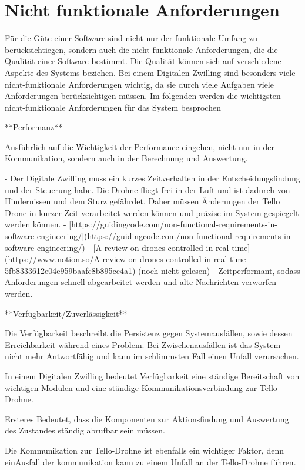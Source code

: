 \section{Nicht funktionale Anforderungen}

Für die Güte einer Software sind nicht nur der funktionale Umfang zu berücksichtiegen, sondern auch die nicht-funktionale Anforderungen, die die Qualität einer Software bestimmt. Die Qualität können sich auf verschiedene Aspekte des Systems beziehen. Bei einem Digitalen Zwilling sind besonders viele nicht-funktionale Anforderungen wichtig, da sie durch viele Aufgaben viele Anforderungen berücksichtigen müssen. Im folgenden werden die wichtigsten nicht-funktionale Anforderungen für das System besprochen

**Performanz**

Ausführlich auf die Wichtigkeit der Performance eingehen, nicht nur in der Kommunikation, sondern auch in der  Berechnung und Auswertung.


- Der Digitale Zwilling muss ein kurzes Zeitverhalten in der Entscheidungsfindung und der Steuerung habe. Die Drohne fliegt frei in der Luft und ist dadurch von Hindernissen und dem Sturz gefährdet. Daher müssen Änderungen der Tello Drone in kurzer Zeit verarbeitet werden können und präzise im System gespiegelt werden können.
    - [https://guidingcode.com/non-functional-requirements-in-software-engineering/](https://guidingcode.com/non-functional-requirements-in-software-engineering/)
    - [A review on drones controlled in real-time](https://www.notion.so/A-review-on-drones-controlled-in-real-time-5fb8333612e04e959baafc8b895cc4a1) (noch nicht gelesen)
- Zeitperformant, sodass Anforderungen schnell abgearbeitet werden und alte Nachrichten verworfen werden.

**Verfügbarkeit/Zuverlässigkeit**

Die Verfügbarkeit beschreibt die Persistenz gegen Systemausfällen, sowie dessen Erreichbarkeit während eines Problem. Bei Zwischenausfällen ist das System nicht mehr Antwortfähig und kann im schlimmsten Fall einen Unfall verursachen. 

In einem Digitalen Zwilling bedeutet Verfügbarkeit eine ständige Bereitschaft von wichtigen Modulen und eine ständige Kommunikationsverbindung zur Tello-Drohne. 

Ersteres Bedeutet, dass die Komponenten zur Aktionsfindung und Auswertung des Zustandes ständig abrufbar sein müssen.

Die Kommunikation zur Tello-Drohne ist ebenfalls ein wichtiger Faktor, denn einAusfall der kommunikation kann zu einem Unfall an der Tello-Drohne führen.

